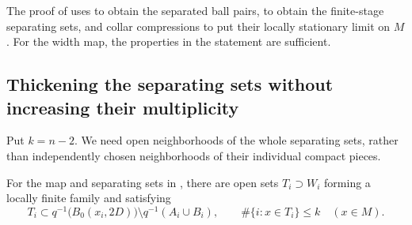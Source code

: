 The proof of  uses
 to obtain the separated ball pairs,
 to obtain the finite-stage separating sets, and
collar compressions to put their locally stationary limit on $M$.
For the width map, the properties in the statement are sufficient.


\subsection{Thickening the separating sets without increasing their multiplicity}

Put $k=n-2$.  We need open neighborhoods of the whole separating sets, rather
than independently chosen neighborhoods of their individual compact
pieces.

\begin{lemma}\label{topology:thicken}
For the map and separating sets in , there are open
sets $T_i\supset W_i$ forming a locally finite family and satisfying
\begin{equation}\label{topology:thickening}
 T_i\subset q^{-1}\bigl(B_0(x_i,2D)\bigr)
                  \setminus q^{-1}(A_i\cup B_i),
 \qquad
 \#\{i:x\in T_i\}\le k\quad(x\in M).
\end{equation}
\end{lemma}

